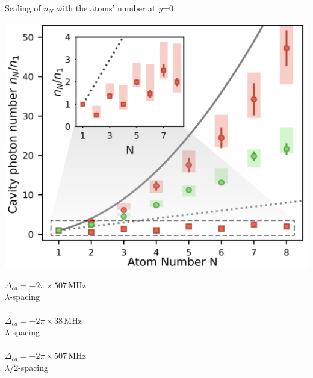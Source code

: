 \documentclass{beamer}
\begin{document}
\begin{frame}{Scaling of $n_N$ with the atoms' number {\tiny at $y$=0}}
	\begin{minipage}{0.68\textwidth}
		\centering
		\includegraphics[width=\textwidth]{Figure_3a.png}
	\end{minipage}
	\begin{minipage}{0.31\textwidth}
		\textcolor[rgb]{0.859, 0.420, 0.329}{$\Delta_{ca}=-2\pi\times 507\,$MHz\\$\lambda$-spacing}\\
		\vspace{2.2em}
		\textcolor[rgb]{0.529, 0.851, 0.455}{\\$\Delta_{ca}=-2\pi\times 38\,$MHz\\$\lambda$-spacing}\\
		\vspace{2.5em}
		\textcolor[rgb]{0.859, 0.420, 0.329}{\\ $\Delta_{ca}=-2\pi\times 507\,$MHz\\$\lambda/2$-spacing}\\
	\end{minipage}
\end{frame}
\end{document}

